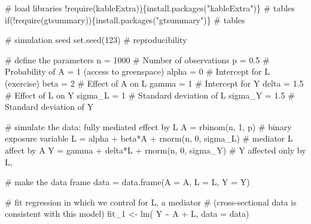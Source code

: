 \documentclass[
  singlecolumn]{article}
\newenvironment{Shaded}{}{}
\newcommand{\AttributeTok}[1]{\textcolor[rgb]{0.84,0.23,0.29}{#1}}
\newcommand{\CommentTok}[1]{\textcolor[rgb]{0.42,0.45,0.49}{#1}}
\newcommand{\ControlFlowTok}[1]{\textcolor[rgb]{0.84,0.23,0.29}{#1}}
\newcommand{\DecValTok}[1]{\textcolor[rgb]{0.00,0.36,0.77}{#1}}
\newcommand{\ErrorTok}[1]{\textcolor[rgb]{1.00,0.33,0.33}{\underline{#1}}}
\newcommand{\FloatTok}[1]{\textcolor[rgb]{0.00,0.36,0.77}{#1}}
\newcommand{\FunctionTok}[1]{\textcolor[rgb]{0.44,0.26,0.76}{#1}}
\newcommand{\NormalTok}[1]{\textcolor[rgb]{0.14,0.16,0.18}{#1}}
\newcommand{\OtherTok}[1]{\textcolor[rgb]{0.44,0.26,0.76}{#1}}
\newcommand{\SpecialCharTok}[1]{\textcolor[rgb]{0.00,0.36,0.77}{#1}}
\newcommand{\StringTok}[1]{\textcolor[rgb]{0.01,0.18,0.38}{#1}}
\begin{document}
\begin{Shaded}
\begin{Highlighting}[]
\CommentTok{\# load libraries}
\SpecialCharTok{!}\FunctionTok{require}\NormalTok{(kableExtra)}\ErrorTok{)}\NormalTok{\{}\FunctionTok{install.packages}\NormalTok{(}\StringTok{"kableExtra"}\NormalTok{)\} }\CommentTok{\# tables}
\ControlFlowTok{if}\NormalTok{(}\SpecialCharTok{!}\FunctionTok{require}\NormalTok{(gtsummary))\{}\FunctionTok{install.packages}\NormalTok{(}\StringTok{"gtsummary"}\NormalTok{)\} }\CommentTok{\# tables}

\CommentTok{\# simulation seed}
\FunctionTok{set.seed}\NormalTok{(}\DecValTok{123}\NormalTok{) }\CommentTok{\#  reproducibility}

\CommentTok{\# define the parameters }
\NormalTok{n }\OtherTok{=} \DecValTok{1000} \CommentTok{\# Number of observations}
\NormalTok{p }\OtherTok{=} \FloatTok{0.5}  \CommentTok{\# Probability of A = 1 (access to greenspace)}
\NormalTok{alpha }\OtherTok{=} \DecValTok{0} \CommentTok{\# Intercept for L (exercise)}
\NormalTok{beta }\OtherTok{=} \DecValTok{2}  \CommentTok{\# Effect of A on L }
\NormalTok{gamma }\OtherTok{=} \DecValTok{1} \CommentTok{\# Intercept for Y }
\NormalTok{delta }\OtherTok{=} \FloatTok{1.5} \CommentTok{\# Effect of L on Y}
\NormalTok{sigma\_L }\OtherTok{=} \DecValTok{1} \CommentTok{\# Standard deviation of L}
\NormalTok{sigma\_Y }\OtherTok{=} \FloatTok{1.5} \CommentTok{\# Standard deviation of Y}

\CommentTok{\# simulate the data: fully mediated effect by L}
\NormalTok{A }\OtherTok{=} \FunctionTok{rbinom}\NormalTok{(n, }\DecValTok{1}\NormalTok{, p) }\CommentTok{\# binary exposure variable}
\NormalTok{L }\OtherTok{=}\NormalTok{ alpha }\SpecialCharTok{+}\NormalTok{ beta}\SpecialCharTok{*}\NormalTok{A }\SpecialCharTok{+} \FunctionTok{rnorm}\NormalTok{(n, }\DecValTok{0}\NormalTok{, sigma\_L) }\CommentTok{\# mediator L affect by A}
\NormalTok{Y }\OtherTok{=}\NormalTok{ gamma }\SpecialCharTok{+}\NormalTok{ delta}\SpecialCharTok{*}\NormalTok{L }\SpecialCharTok{+} \FunctionTok{rnorm}\NormalTok{(n, }\DecValTok{0}\NormalTok{, sigma\_Y) }\CommentTok{\# Y affected only by L,}

\CommentTok{\# make the data frame}
\NormalTok{data }\OtherTok{=} \FunctionTok{data.frame}\NormalTok{(}\AttributeTok{A =}\NormalTok{ A, }\AttributeTok{L =}\NormalTok{ L, }\AttributeTok{Y =}\NormalTok{ Y)}

\CommentTok{\# fit regression in which we control for L, a mediator}
\CommentTok{\# (cross{-}sectional data is consistent with this model)}
\NormalTok{fit\_1 }\OtherTok{\textless{}{-}} \FunctionTok{lm}\NormalTok{( Y }\SpecialCharTok{\textasciitilde{}}\NormalTok{ A }\SpecialCharTok{+}\NormalTok{ L, }\AttributeTok{data =}\NormalTok{ data)}


\end{Highlighting}
\end{Shaded}
\end{document}
